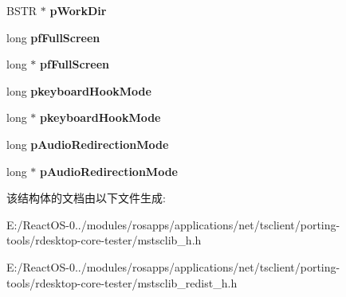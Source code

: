 \begin{DoxyCompactItemize}
B\+S\+TR $\ast$ {\bfseries p\+Work\+Dir}
\item 
\mbox{\label{struct_i_ms_rdp_client_secured_settings_vtbl_a5606d1cc3a41294c9f25dcf53b81f296}} 
long {\bfseries pf\+Full\+Screen}
\item 
\mbox{\label{struct_i_ms_rdp_client_secured_settings_vtbl_a18b3cb5203d0023b1a86b6609702bfad}} 
long $\ast$ {\bfseries pf\+Full\+Screen}
\item 
\mbox{\label{struct_i_ms_rdp_client_secured_settings_vtbl_a28b39f0bffb67c85d1355567502da282}} 
long {\bfseries pkeyboard\+Hook\+Mode}
\item 
\mbox{\label{struct_i_ms_rdp_client_secured_settings_vtbl_ae5f97e101878eddbf20c0252e17c840c}} 
long $\ast$ {\bfseries pkeyboard\+Hook\+Mode}
\item 
\mbox{\label{struct_i_ms_rdp_client_secured_settings_vtbl_aaf6fa7ba162a3347c28d124b6c31a563}} 
long {\bfseries p\+Audio\+Redirection\+Mode}
\item 
\mbox{\label{struct_i_ms_rdp_client_secured_settings_vtbl_aa3ed428b1141b0b878d7e920bc85c7d0}} 
long $\ast$ {\bfseries p\+Audio\+Redirection\+Mode}
\end{DoxyCompactItemize}


该结构体的文档由以下文件生成\+:\begin{DoxyCompactItemize}
\item 
E\+:/\+React\+O\+S-\/0../modules/rosapps/applications/net/tsclient/porting-\/tools/rdesktop-\/core-\/tester/mstsclib\+\_\+h.\+h\item 
E\+:/\+React\+O\+S-\/0../modules/rosapps/applications/net/tsclient/porting-\/tools/rdesktop-\/core-\/tester/mstsclib\+\_\+redist\+\_\+h.\+h\end{DoxyCompactItemize}
